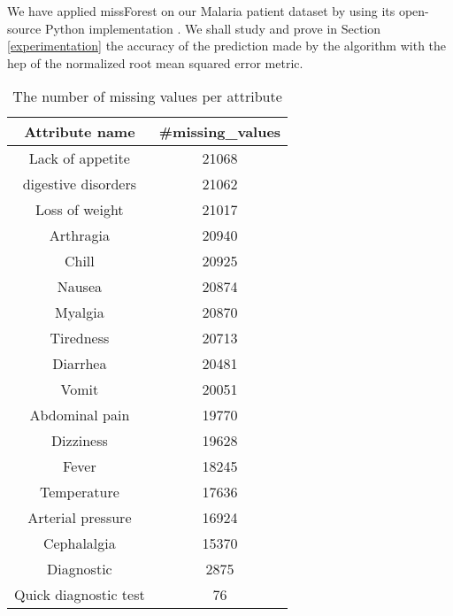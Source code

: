 We have applied missForest on our Malaria patient dataset by using its open-source Python implementation \cite{MF_python}. We shall study and prove in Section \ref{experimentation} the accuracy of
the prediction made by the algorithm with the hep of the normalized root mean squared error metric.  

\begin{table}[!ht]
\centering
\begin{tabular}{cc}
\textbf{Attribute name} & \textbf{\#missing\_values}\\
\toprule
Lack of appetite &    21068 \\
digestive disorders & 21062 \\
Loss of weight &   21017 \\
Arthragia &     20940\\
Chill &      20925\\
Nausea &     20874\\
Myalgia &    20870\\
Tiredness&   20713 \\
Diarrhea &     20481\\
Vomit &        20051 \\
Abdominal pain &  19770 \\
Dizziness &       19628 \\
Fever &        18245 \\
Temperature &     17636 \\
Arterial pressure &    16924 \\
Cephalalgia &       15370 \\
Diagnostic  &     2875 \\
Quick diagnostic test &  76 \\
\bottomrule
\end{tabular}
\vspace*{.5cm}
\caption{The number of missing values per attribute}\label{table-missing}
\end{table} 
